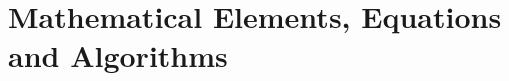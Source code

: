\chapter[Mathematical Elements]{Mathematical Elements, Equations and Algorithms}
\label{cha:Mathematics}

